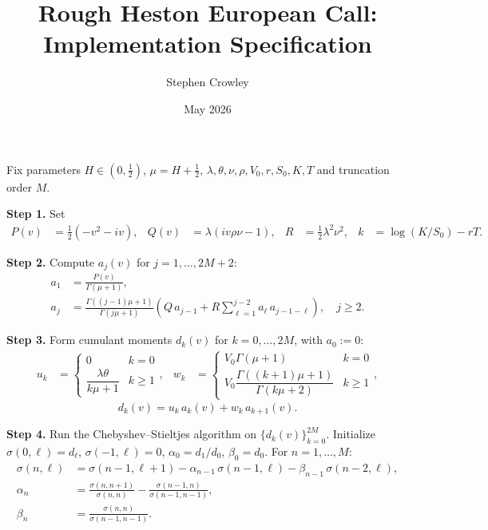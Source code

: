 \documentclass{article}
\begin{document}
\title{Rough Heston European Call: Implementation Specification}
\author{Stephen Crowley}
\date{May 2026}
\maketitle

Fix parameters $H\in(0,\tfrac12)$, $\mu=H+\tfrac12$,
$\lambda,\theta,\nu,\rho,V_0,r,S_0,K,T$ and truncation order $M$.

\bigskip
\noindent\textbf{Step 1.} Set
\begin{align}
P(v) &= \tfrac12(-v^2-iv), &
Q(v) &= \lambda(iv\rho\nu-1), &
R &= \tfrac12\lambda^2\nu^2, &
k &= \log(K/S_0)-rT.
\end{align}

\bigskip
\noindent\textbf{Step 2.} Compute $a_j(v)$ for $j=1,\ldots,2M+2$:
\begin{align}
a_1 &= \frac{P(v)}{\Gamma(\mu+1)}, \\
a_j &= \frac{\Gamma((j-1)\mu+1)}{\Gamma(j\mu+1)}
\!\left(Q\,a_{j-1}+R\sum_{\ell=1}^{j-2}a_\ell\,a_{j-1-\ell}\right),
\quad j\ge2.
\end{align}

\bigskip
\noindent\textbf{Step 3.} Form cumulant moments $d_k(v)$ for $k=0,\ldots,2M$,
with $a_0:=0$:
\begin{align}
u_k &= \begin{cases}0&k=0\\[2pt]\dfrac{\lambda\theta}{k\mu+1}&k\ge1\end{cases}, &
w_k &= \begin{cases}V_0\Gamma(\mu+1)&k=0\\[4pt]
V_0\dfrac{\Gamma((k+1)\mu+1)}{\Gamma(k\mu+2)}&k\ge1\end{cases},
\end{align}
\begin{equation}
d_k(v) = u_k\,a_k(v)+w_k\,a_{k+1}(v).
\end{equation}

\bigskip
\noindent\textbf{Step 4.} Run the Chebyshev--Stieltjes algorithm on
$\{d_k(v)\}_{k=0}^{2M}$. Initialize $\sigma(0,\ell)=d_\ell$,
$\sigma(-1,\ell)=0$, $\alpha_0=d_1/d_0$, $\beta_0=d_0$.
For $n=1,\ldots,M$:
\begin{align}
\sigma(n,\ell) &= \sigma(n-1,\ell+1)
-\alpha_{n-1}\,\sigma(n-1,\ell)-\beta_{n-1}\,\sigma(n-2,\ell), \\
\alpha_n &= \frac{\sigma(n,n+1)}{\sigma(n,n)}
-\frac{\sigma(n-1,n)}{\sigma(n-1,n-1)}, \\
\beta_n &= \frac{\sigma(n,n)}{\sigma(n-1,n-1)}.
\end{align}
\end{document}
